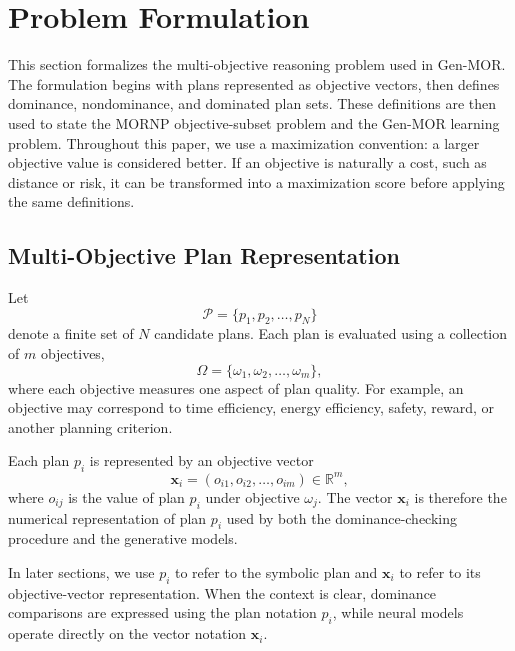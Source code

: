 \section{Problem Formulation}
\label{sec:problem_formulation}

This section formalizes the multi-objective reasoning problem used in Gen-MOR. The formulation begins with plans represented as objective vectors, then defines dominance, nondominance, and dominated plan sets. These definitions are then used to state the MORNP objective-subset problem and the Gen-MOR learning problem. Throughout this paper, we use a maximization convention: a larger objective value is considered better. If an objective is naturally a cost, such as distance or risk, it can be transformed into a maximization score before applying the same definitions.

\subsection{Multi-Objective Plan Representation}
\label{subsec:plan_representation}

Let
\begin{equation}
    \mathcal{P} = \{p_1, p_2, \ldots, p_N\}
    \label{eq:plan_set}
\end{equation}
denote a finite set of $N$ candidate plans. Each plan is evaluated using a collection of $m$ objectives,
\begin{equation}
    \Omega = \{\omega_1, \omega_2, \ldots, \omega_m\},
    \label{eq:objective_set}
\end{equation}
where each objective measures one aspect of plan quality. For example, an objective may correspond to time efficiency, energy efficiency, safety, reward, or another planning criterion.

Each plan $p_i$ is represented by an objective vector
\begin{equation}
    \mathbf{x}_i = (o_{i1}, o_{i2}, \ldots, o_{im}) \in \mathbb{R}^{m},
    \label{eq:plan_vector}
\end{equation}
where $o_{ij}$ is the value of plan $p_i$ under objective $\omega_j$. The vector $\mathbf{x}_i$ is therefore the numerical representation of plan $p_i$ used by both the dominance-checking procedure and the generative models.

In later sections, we use $p_i$ to refer to the symbolic plan and $\mathbf{x}_i$ to refer to its objective-vector representation. When the context is clear, dominance comparisons are expressed using the plan notation $p_i$, while neural models operate directly on the vector notation $\mathbf{x}_i$.

